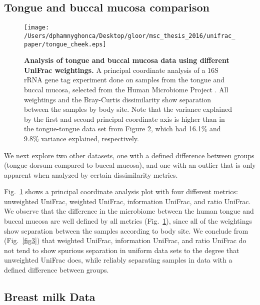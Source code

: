 \documentclass[10pt,letterpaper]{article}
\begin{document}
\FloatBarrier

\subsection{Tongue and buccal mucosa comparison}

\begin{figure}[h]
\texttt{[image: /Users/dphamnyghonca/Desktop/gloor/msc\_thesis\_2016/unifrac\_paper/tongue\_cheek.eps]}
\caption[Analysis of tongue and buccal mucosa data using different UniFrac weightings.]{{\bf Analysis of tongue and buccal mucosa data using different UniFrac weightings. }
A principal coordinate analysis of a 16S rRNA gene tag experiment done on samples from the tongue and buccal mucosa, selected from the Human Microbiome Project \cite{turnbaugh2007human}. All weightings and the Bray-Curtis dissimilarity show separation between the samples by body site. Note that the variance explained by the first and second principal coordinate axis is higher than in the tongue-tongue data set from Figure 2, which had 16.1\% and 9.8\% variance explained, respectively.}
\label{fig6}
\end{figure}

We next explore two other datasets, one with a defined difference between groups (tongue dorsum compared to buccal mucosa), and one with an outlier that is only apparent when analyzed by certain dissimilarity metrics.

Fig.~\ref{fig6} shows a principal coordinate analysis plot with four different metrics: unweighted UniFrac, weighted UniFrac, information UniFrac, and ratio UniFrac. We observe that the difference in the microbiome between the human tongue and buccal mucosa are well defined by all metrics (Fig.~\ref{fig6}), since all of the weightings show separation between the samples according to body site. We conclude from (Fig.~\ref{fig3}) that weighted UniFrac, information UniFrac, and ratio UniFrac do not tend to show spurious separation in uniform data sets to the degree that unweighted UniFrac does, while reliably separating samples in data with a defined difference between groups.

\FloatBarrier

\subsection{Breast milk Data}
\end{document}
